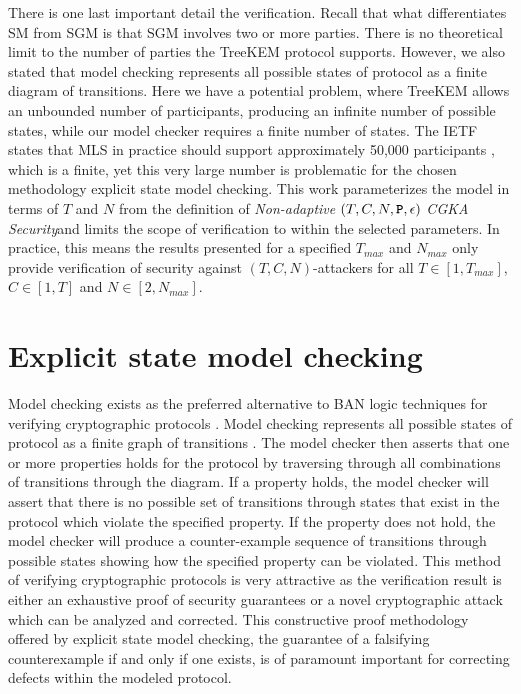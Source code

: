 There is one last important detail the verification.
Recall that what differentiates SM from SGM is that SGM involves two or more parties.
There is no theoretical limit to the number of parties the TreeKEM protocol supports.
However, we also stated that model checking represents all possible states of protocol as a finite diagram of transitions.
Here we have a potential problem, where TreeKEM allows an unbounded number of participants, producing an infinite number of possible states, while our model checker requires a finite number of states.
The IETF states that MLS in practice should support approximately 50,000 participants \autocite{Omara2020}, which is a finite, yet this very large number is problematic for the chosen methodology explicit state model checking.
This work parameterizes the model in terms of \(T\) and \(N\) from the definition of \emph{Non-adaptive} \((T, C, N, \textbf{\texttt{P}}, \epsilon)\) \emph{CGKA Security}and limits the scope of verification to within the selected parameters.
In practice, this means the results presented for a specified \(T_{max}\) and \(N_{max}\) only provide verification of security against \((T, C, N)\)-attackers for all \(T \in [1, T_{max}]\), \(C \in [1, T]\) and \(N \in [2, N_{max}]\).

\hypertarget{explicit-state-model-checking}{%
\section{Explicit state model checking}\label{explicit-state-model-checking}}

Model checking exists as the preferred alternative to BAN logic techniques for verifying cryptographic protocols \autocite{kacprzak2006comparing} \autocite{lomuscio2007verification} \autocite{van2004symbolic}.
Model checking represents all possible states of protocol as a finite graph of transitions \autocite{clarke1981design}.
The model checker then asserts that one or more properties holds for the protocol by traversing through all combinations of transitions through the diagram.
If a property holds, the model checker will assert that there is no possible set of transitions through states that exist in the protocol which violate the specified property.
If the property does not hold, the model checker will produce a counter-example sequence of transitions through possible states showing how the specified property can be violated.
This method of verifying cryptographic protocols is very attractive as the verification result is either an exhaustive proof of security guarantees or a novel cryptographic attack which can be analyzed and corrected.
This constructive proof methodology offered by explicit state model checking, the guarantee of a falsifying counterexample if and only if one exists, is of paramount important for correcting defects within the modeled protocol.

